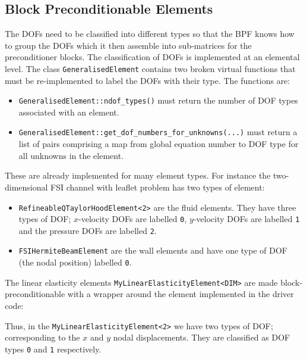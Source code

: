\subsection{Block Preconditionable Elements\label{sec:block_preconditionable_elements}}
The DOFs need to be classified into different types so that the BPF knows how
to group the DOFs which it then assemble into sub-matrices for the 
preconditioner blocks. The classification of DOFs is implemented at an 
elemental level. The class \verb+GeneralisedElement+ contains two broken 
virtual functions that must be re-implemented to label the DOFs with their 
type. The functions are:
\begin{itemize}
\item \verb+GeneralisedElement::ndof_types()+ must return the number of DOF 
types associated with an element.
\item \verb+GeneralisedElement::get_dof_numbers_for_unknowns(...)+ must return 
a list of pairs comprising a map from global equation number to DOF type for 
all unknowns in the element.
\end{itemize}
These are already implemented for many element types. For instance the 
two-dimensional FSI channel with leaflet problem has two types of element:
\begin{itemize}
\item \verb+RefineableQTaylorHoodElement<2>+ are the fluid elements. They have
three types of DOF; $x$-velocity DOFs are labelled \verb+0+, $y$-velocity DOFs
are labelled \verb+1+ and the pressure DOFs are labelled \verb+2+.
\item \verb+FSIHermiteBeamElement+ are the wall elements and have one type of
  DOF (the nodal position) labelled \verb+0+.
\end{itemize}
The linear elasticity elements \verb+MyLinearElasticityElement<DIM>+ are made 
block-preconditionable with a wrapper around the element implemented in the 
driver code:
\lstset{numberfirstline=true,numberstyle=\scriptsize,breaklines=true, numbers=left, stepnumber=2, frame=single,basicstyle=\ttfamily\scriptsize, showstringspaces=false, language=C++}

Thus, in the \verb+MyLinearElasticityElement<2>+ we have two types of DOF; 
corresponding to the $x$ and $y$ nodal displacements. They are classified as 
DOF types \verb+0+ and \verb+1+ respectively.

